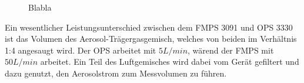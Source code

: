 \begin{figure}[H]
	\myfloatalign
	 \quad
	\caption[Blabla]
	{Blabla}
\end{figure}

Ein wesentlicher Leistungsunterschied zwischen dem FMPS 3091 und OPS 3330 ist das Volumen des Aerosol-Tr\"{a}gergasgemisch, welches von beiden im Verh\"{a}ltnis 1:4 angesaugt wird. Der OPS arbeitet mit $5 L/min$, w\"{a}rend der FMPS mit $50 L/min$ arbeitet. Ein Teil des Luftgemisches wird dabei vom Ger\"{a}t gefiltert und dazu genutzt, den Aerosolstrom zum Messvolumen zu f\"{u}hren.